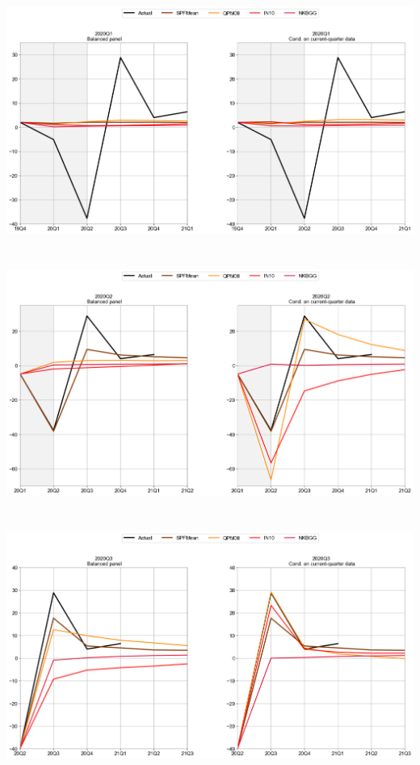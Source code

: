 \documentclass{article}
\begin{document}
\includegraphics[scale=0.5]{Top3_models_BP_2020Q1}\\ \bigskip \\ \bigskip  \\
\includegraphics[scale=0.5]{Top3_models_BP_2020Q2}\\  \bigskip \\ \bigskip  \\
\includegraphics[scale=0.5]{Top3_models_BP_2020Q3}\\  \bigskip \\ \bigskip  \\
\end{document}

